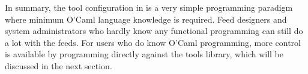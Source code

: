 In summary, the tool configuration in \padsd{} is a very simple programming 
paradigm where minimum O'Caml language knowledge is required. Feed designers
and system administrators who hardly know any functional programming can still 
do a lot with the feeds. For users who do know O'Caml programming, more control
is available by programming directly against the \padsd{} tools library, which
will be discussed in the next section.

